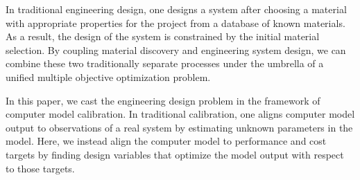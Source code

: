\documentclass[12pt]{article}
\begin{document}
%
In traditional engineering design, one designs a system after choosing a material with appropriate properties for the project from a database of known materials. 
%
%
As a result, the design of the system is constrained by the initial material selection.
%
By coupling material discovery and engineering system design, we can combine these two traditionally separate processes under the umbrella of a unified multiple objective optimization problem.
%

%
In this paper, we cast the engineering design problem in the framework of computer model calibration.
%
In traditional calibration, one aligns computer model output to observations of a real system by estimating unknown parameters in the model.
%
Here, we instead align the computer model to performance and cost targets by finding design variables that optimize the model output with respect to those targets.
%

%
%
\end{document}
